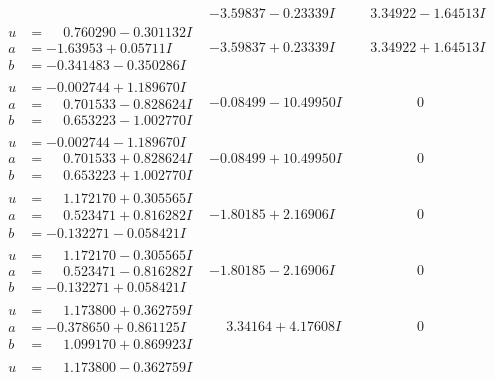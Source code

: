 \documentclass[1p]{elsarticle_modified}
\theoremstyle{definition}
\begin{document}
$$\begin{array}{c|c|c}
 & -3.59837 - 0.23339 I & \phantom{-}3.34922 - 1.64513 I \\ \hline\begin{aligned}
u &= \phantom{-}0.760290 - 0.301132 I \\
a &= -1.63953 + 0.05711 I \\
b &= -0.341483 - 0.350286 I\end{aligned}
 & -3.59837 + 0.23339 I & \phantom{-}3.34922 + 1.64513 I \\ \hline\begin{aligned}
u &= -0.002744 + 1.189670 I \\
a &= \phantom{-}0.701533 - 0.828624 I \\
b &= \phantom{-}0.653223 - 1.002770 I\end{aligned}
 & -0.08499 - 10.49950 I & \phantom{-0.000000 } 0 \\ \hline\begin{aligned}
u &= -0.002744 - 1.189670 I \\
a &= \phantom{-}0.701533 + 0.828624 I \\
b &= \phantom{-}0.653223 + 1.002770 I\end{aligned}
 & -0.08499 + 10.49950 I & \phantom{-0.000000 } 0 \\ \hline\begin{aligned}
u &= \phantom{-}1.172170 + 0.305565 I \\
a &= \phantom{-}0.523471 + 0.816282 I \\
b &= -0.132271 - 0.058421 I\end{aligned}
 & -1.80185 + 2.16906 I & \phantom{-0.000000 } 0 \\ \hline\begin{aligned}
u &= \phantom{-}1.172170 - 0.305565 I \\
a &= \phantom{-}0.523471 - 0.816282 I \\
b &= -0.132271 + 0.058421 I\end{aligned}
 & -1.80185 - 2.16906 I & \phantom{-0.000000 } 0 \\ \hline\begin{aligned}
u &= \phantom{-}1.173800 + 0.362759 I \\
a &= -0.378650 + 0.861125 I \\
b &= \phantom{-}1.099170 + 0.869923 I\end{aligned}
 & \phantom{-}3.34164 + 4.17608 I & \phantom{-0.000000 } 0 \\ \hline\begin{aligned}
u &= \phantom{-}1.173800 - 0.362759 I \\

\end{aligned}
\end{array}$$
\end{document}
